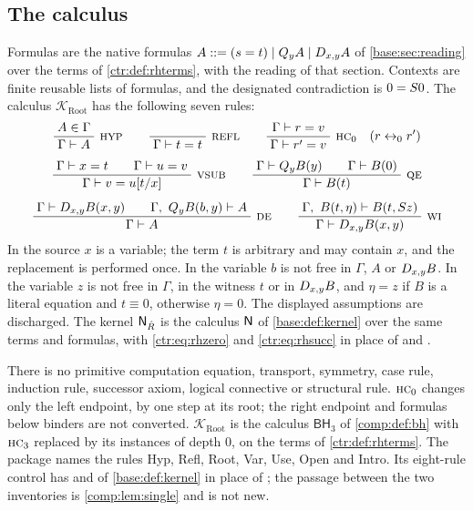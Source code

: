 \subsection{The calculus}

\begin{definition}\label{ctr:def:root}
Formulas are the native formulas $A::=(s=t)\mid Q_{y}A\mid D_{x,y}A$ of
\cref{base:sec:reading} over the terms of \cref{ctr:def:rhterms}, with the reading of that
section. Contexts are finite reusable lists of formulas, and the designated contradiction is
$0=S 0$. The calculus $\mathcal K_{\mathrm{Root}}$ has the following seven rules:
\begin{gather*}
 \infrule{A\in\Gamma}{\Gamma\proves A}\ \rulename{Hyp}
 \qquad
 \infrule{}{\Gamma\proves t=t}\ \rulename{Refl}
 \qquad
 \infrule{\Gamma\proves r=v}{\Gamma\proves r'=v}\ \rulename{HC}_0\quad(r\leftrightarrow_0 r')
 \\[1.2ex]
 \infrule{\Gamma\proves x=t\qquad\Gamma\proves u=v}
         {\Gamma\proves v=u\subst{t}{x}}\ \rulename{VSub}
 \qquad
 \infrule{\Gamma\proves\Q{y}B(y)\qquad\Gamma\proves B(0)}
         {\Gamma\proves B(t)}\ \rulename{QE}
 \\[1.2ex]
 \infrule{\Gamma\proves\D{x}{y}B(x,y)\qquad\Gamma,\ \Q{y}B(b,y)\proves A}
         {\Gamma\proves A}\ \rulename{DE}
 \qquad
 \infrule{\Gamma,\ B(t,\eta)\proves B(t,\Suc z)}
         {\Gamma\proves\D{x}{y}B(x,y)}\ \rulename{WI}
\end{gather*}
In  the source $x$ is a variable; the term $t$ is arbitrary and may contain
$x$, and the replacement is performed once. In  the variable $b$ is not free in
$\Gamma$, $A$ or $D_{x,y}B$. In  the variable $z$ is not free in $\Gamma$, in the
witness $t$ or in $D_{x,y}B$, and $\eta=z$ if $B$ is a literal equation and $t\equiv 0$,
otherwise $\eta=0$. The displayed assumptions are discharged. The kernel $\mathsf{N}_{\hat R}$ is
the calculus $\mathsf{N}$ of \cref{base:def:kernel} over the same terms and formulas, with
\eqref{ctr:eq:rhzero} and \eqref{ctr:eq:rhsucc} in place of  and .
\end{definition}

There is no primitive computation equation, transport, symmetry, case rule, induction rule,
successor axiom, logical connective or structural rule. $\rulename{HC}_0$ changes only the left
endpoint, by one step at its root; the right endpoint and formulas below binders are not
converted. $\mathcal K_{\mathrm{Root}}$ is the calculus $\mathsf{BH}_3$ of \cref{comp:def:bh}
with $\rulename{HC}_3$ replaced by its instances of depth $0$, on the terms of
\cref{ctr:def:rhterms}. The package names the rules Hyp, Refl, Root, Var, Use, Open and
Intro. Its eight-rule control has  and  of \cref{base:def:kernel} in
place of ; the passage between the two inventories is \cref{comp:lem:single} and
is not new.

